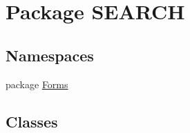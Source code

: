 \hypertarget{namespace_s_e_a_r_c_h}{\section{Package S\-E\-A\-R\-C\-H}
\label{namespace_s_e_a_r_c_h}
}
\subsection*{Namespaces}
\begin{DoxyCompactItemize}
\item 
package \hyperlink{namespace_s_e_a_r_c_h_1_1_forms}{Forms}
\end{DoxyCompactItemize}
\subsection*{Classes}

